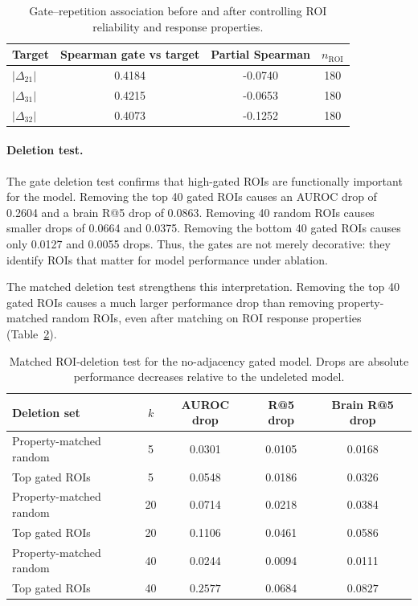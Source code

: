 \documentclass{article}
\begin{document}
\begin{table}[!htbp]
  \centering
  \caption{Gate--repetition association before and after controlling ROI reliability and response properties.}
  \label{tab:gate_confound}
  \scriptsize
  \setlength{\tabcolsep}{5pt}
  \renewcommand{\arraystretch}{1.15}
  \begin{tabular}{lccc}
    \toprule
    Target & Spearman gate vs target & Partial Spearman & $n_{\mathrm{ROI}}$ \\
    \midrule
    $|\Delta_{21}|$ & 0.4184 & -0.0740 & 180 \\
    $|\Delta_{31}|$ & 0.4215 & -0.0653 & 180 \\
    $|\Delta_{32}|$ & 0.4073 & -0.1252 & 180 \\
    \bottomrule
  \end{tabular}
\end{table}

\paragraph{Deletion test.}
The gate deletion test confirms that high-gated ROIs are functionally important for the model. Removing the top 40 gated ROIs causes an AUROC drop of 0.2604 and a brain R@5 drop of 0.0863. Removing 40 random ROIs causes smaller drops of 0.0664 and 0.0375. Removing the bottom 40 gated ROIs causes only 0.0127 and 0.0055 drops. Thus, the gates are not merely decorative: they identify ROIs that matter for model performance under ablation.

The matched deletion test strengthens this interpretation. Removing the top 40 gated ROIs causes a much larger performance drop than removing property-matched random ROIs, even after matching on ROI response properties (Table~\ref{tab:matched_deletion}).

\begin{table}[!htbp]
  \centering
  \caption{Matched ROI-deletion test for the no-adjacency gated model. Drops are absolute performance decreases relative to the undeleted model.}
  \label{tab:matched_deletion}
  \scriptsize
  \setlength{\tabcolsep}{5pt}
  \renewcommand{\arraystretch}{1.15}
  \begin{tabular}{lcccc}
    \toprule
    Deletion set & $k$ & AUROC drop & R@5 drop & Brain R@5 drop \\
    \midrule
    Property-matched random & 5 & 0.0301 & 0.0105 & 0.0168 \\
    Top gated ROIs & 5 & 0.0548 & 0.0186 & 0.0326 \\
    Property-matched random & 20 & 0.0714 & 0.0218 & 0.0384 \\
    Top gated ROIs & 20 & 0.1106 & 0.0461 & 0.0586 \\
    Property-matched random & 40 & 0.0244 & 0.0094 & 0.0111 \\
    Top gated ROIs & 40 & $\mathbf{0.2577}$ & $\mathbf{0.0684}$ & $\mathbf{0.0827}$ \\
    \bottomrule
  \end{tabular}
\end{table}
\end{document}

